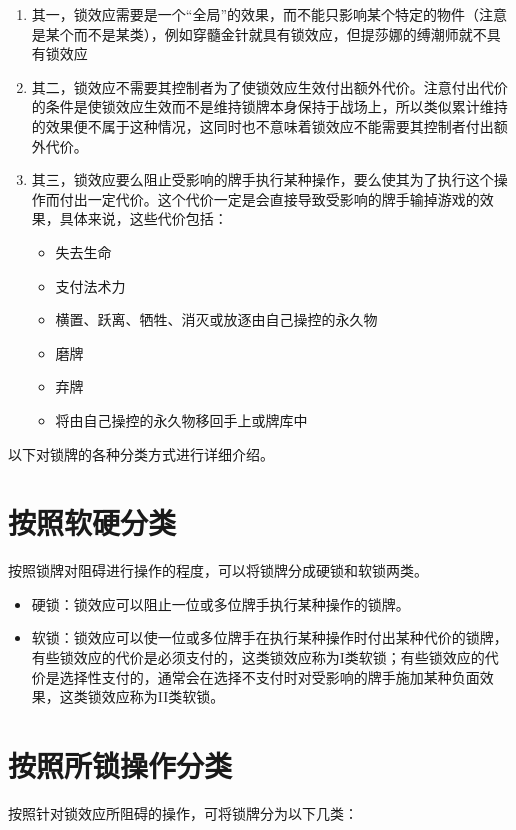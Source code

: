 \documentclass[lang = cn, color = black, 10pt]{AllThatStax}
\begin{document}
\begin{enumerate}
	\item 其一，锁效应需要是一个“全局”的效果，而不能只影响某个特定的物件（注意是某个而不是某类），例如穿髓金针就具有锁效应，但提莎娜的缚潮师就不具有锁效应
	\item 其二，锁效应不需要其控制者为了使锁效应生效付出额外代价。注意付出代价的条件是使锁效应生效而不是维持锁牌本身保持于战场上，所以类似累计维持的效果便不属于这种情况，这同时也不意味着锁效应不能需要其控制者付出额外代价。
	\item 其三，锁效应要么阻止受影响的牌手执行某种操作，要么使其为了执行这个操作而付出一定代价。这个代价一定是会直接导致受影响的牌手输掉游戏的效果，具体来说，这些代价包括：
		\begin{itemize}
			\item 失去生命
			\item 支付法术力
			\item 横置、跃离、牺牲、消灭或放逐由自己操控的永久物
			\item 磨牌
			\item 弃牌
			\item 将由自己操控的永久物移回手上或牌库中
		\end{itemize}
\end{enumerate}

以下对锁牌的各种分类方式进行详细介绍。

\section*{按照软硬分类}

按照锁牌对阻碍进行操作的程度，可以将锁牌分成硬锁和软锁两类。

\begin{itemize}
    \item 硬锁：锁效应可以阻止一位或多位牌手执行某种操作的锁牌。
    \item 软锁：锁效应可以使一位或多位牌手在执行某种操作时付出某种代价的锁牌，有些锁效应的代价是必须支付的，这类锁效应称为I类软锁；有些锁效应的代价是选择性支付的，通常会在选择不支付时对受影响的牌手施加某种负面效果，这类锁效应称为II类软锁。
\end{itemize}

\section*{按照所锁操作分类}

按照针对锁效应所阻碍的操作，可将锁牌分为以下几类：
\end{document}
